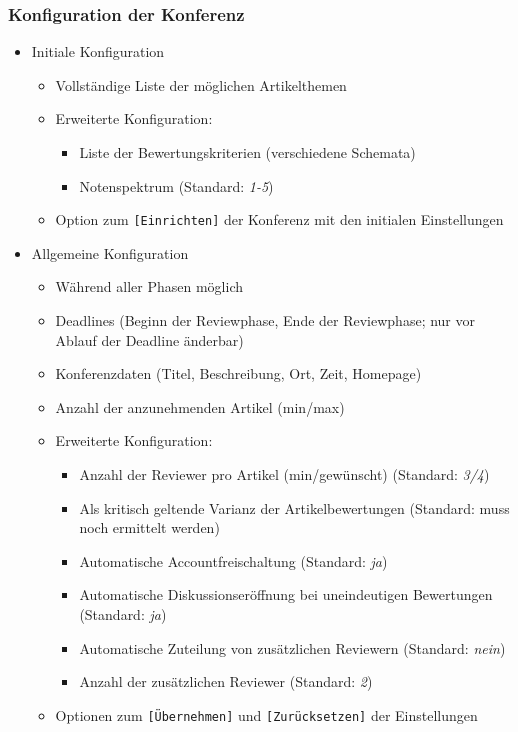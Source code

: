 \documentclass[headexclude,footexclude,12pt,BCOR0pt,DIV15]{scrartcl}
\begin{document}
        \subsubsection{Konfiguration der Konferenz}
        \begin{itemize}
            \item Initiale Konfiguration
            \begin{itemize}
                \item Vollst\"{a}ndige Liste der m\"{o}glichen Artikelthemen
                \item Erweiterte Konfiguration:
                \begin{itemize}
                    \item Liste der Bewertungskriterien (verschiedene Schemata)
                    \item Notenspektrum (Standard: \textit{1-5})
                \end{itemize}
                \item Option zum \texttt{[Einrichten]} der Konferenz mit den initialen Einstellungen
            \end{itemize}
            \item Allgemeine Konfiguration
            \begin{itemize}
                \item W\"{a}hrend aller Phasen m\"{o}glich
                \item Deadlines (Beginn der Reviewphase, Ende der Reviewphase; nur vor Ablauf der Deadline \"{a}nderbar)
                \item Konferenzdaten (Titel, Beschreibung, Ort, Zeit, Homepage)
                \item Anzahl der anzunehmenden Artikel (min/max)
                \item Erweiterte Konfiguration:
                \begin{itemize}
                    \item Anzahl der Reviewer pro Artikel (min/gew\"{u}nscht) (Standard: \textit{3/4})
                    \item Als kritisch geltende Varianz der Artikelbewertungen (Standard: muss noch ermittelt werden)
                    \item Automatische Accountfreischaltung (Standard: \textit{ja})
                    \item Automatische Diskussionser\"{o}ffnung bei uneindeutigen Bewertungen (Standard: \textit{ja})
                    \item Automatische Zuteilung von zus\"{a}tzlichen Reviewern (Standard: \textit{nein})
                    \item Anzahl der zus\"{a}tzlichen Reviewer (Standard: \textit{2})
                \end{itemize}
                \item Optionen zum \texttt{[\"{U}bernehmen]} und \texttt{[Zur\"{u}cksetzen]} der Einstellungen
            \end{itemize}
        \end{itemize}
\end{document}
